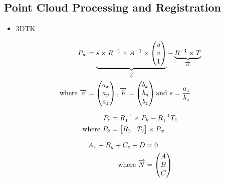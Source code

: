 \subsection{Point Cloud Processing and Registration}
\begin{itemize}
	\item 3DTK
\end{itemize}	


\begin{align}
	\label{equation:3dlaserpoint}				
	P_w &= 	\underbrace{s \times R^{-1} 
 					 							\times A^{-1} 
					 							\times \begin{pmatrix}
								  								u \\
								  								v \\
								  								1 \\
								 								\end{pmatrix}
										 }_\text{$\overrightarrow{b}$}
					- 
					\underbrace{
											R^{-1} \times T					
										 }_\text{$\overrightarrow{a}$} \\
	\text{where}~	
	\overrightarrow{a} &= \begin{pmatrix}
													a_x \\
													a_y \\
													a_z \\
												\end{pmatrix}, 
	\overrightarrow{b} = \begin{pmatrix}
													b_x \\
													b_y \\
													b_z \\
												\end{pmatrix} \text{and}~
	s = \frac{a_z}{b_z} \notag
\end{align}

\begin{align}
	\label{equation:right2left}				
	P_c &= R_1^{-1} \times P_k - R_1^{-1}T_1 \\
	\text{where}~ 
	P_k &= \begin{bmatrix}
									R_2 \mid T_2
 				  \end{bmatrix} \times P_w \notag
\end{align}

\begin{align}
	\label{equation:laserplaneequation}				
	A_x + B_y + C_z + D &= 0 \\
	\text{where}~
	 \overrightarrow{N} &=
	 \begin{pmatrix}
	  A \\
	  B \\
	  C \\
	 \end{pmatrix} \notag
\end{align}

